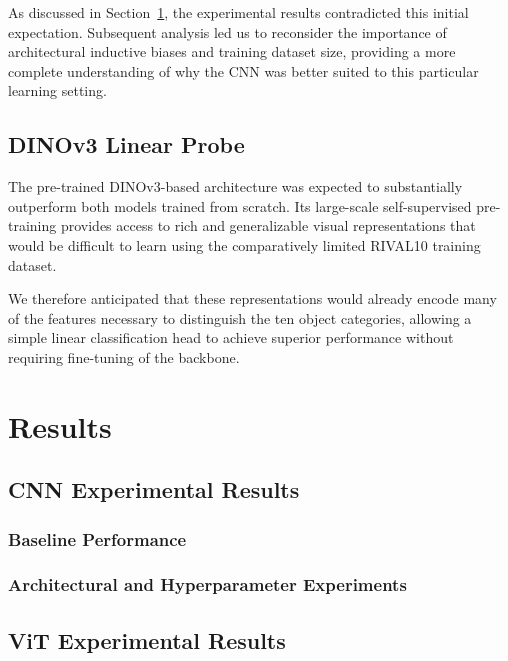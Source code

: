 \documentclass[conference]{IEEEtran}
\begin{document}
As discussed in Section~\ref{sec:results}, the experimental
results contradicted this initial expectation. Subsequent
analysis led us to reconsider the importance of
architectural inductive biases and training dataset size,
providing a more complete understanding of why the CNN
was better suited to this particular learning setting.

\subsection{DINOv3 Linear Probe}

The pre-trained DINOv3-based architecture was expected
to substantially outperform both models trained from
scratch. Its large-scale self-supervised pre-training
provides access to rich and generalizable visual
representations that would be difficult to learn using
the comparatively limited RIVAL10 training dataset.

We therefore anticipated that these representations
would already encode many of the features necessary to
distinguish the ten object categories, allowing a simple
linear classification head to achieve superior
performance without requiring fine-tuning of the backbone.



\section{Results}
\label{sec:results}

\subsection{CNN Experimental Results}

\subsubsection{Baseline Performance}

\subsubsection{Architectural and Hyperparameter Experiments}


\subsection{ViT Experimental Results}
\end{document}
